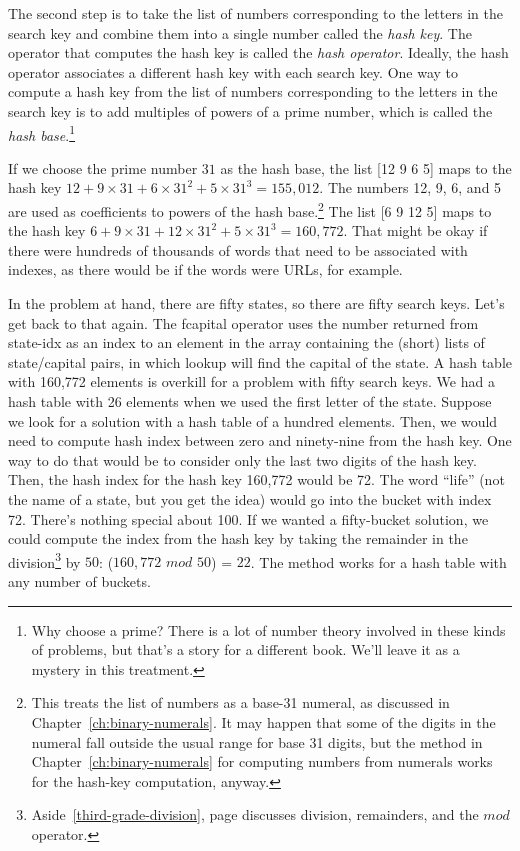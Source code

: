 The second step is to take the list of numbers corresponding
to the letters in the search key
and combine them into a single number called
the \emph{hash key}.
The operator that computes the hash key is called
the \emph{hash operator}.
Ideally, the hash operator associates a different hash key
with each search key.
One way to compute a hash key from the list of numbers
corresponding to the letters in the search key is
to add multiples of powers of a
prime number, which is called the 
\emph{hash base}.\footnote{Why choose a prime?
There is a lot of number theory involved in these kinds
of problems, but that's a story for a different book.
We'll leave it as a mystery in this treatment.}

If we choose the prime number $31$
as the hash base, the list \textsf{[12 9 6 5]} maps to the hash key
$12 + 9\times31 + 6\times31^2 + 5\times31^3 = 155,012$.
The numbers 12, 9, 6, and 5 are used as coefficients to powers of
the hash base.\footnote{This treats the 
list of numbers as a base-31 numeral, as
discussed in Chapter~\ref{ch:binary-numerals}.
It may happen that some of the digits in the numeral
fall outside the usual range for base 31 digits, 
but the method in Chapter~\ref{ch:binary-numerals}
for computing numbers from numerals works 
for the hash-key computation, anyway.}
The list \textsf{[6 9 12 5]} maps to the hash key
$6 + 9\times31 + 12\times31^2 + 5\times31^3 = 160,772$.
That might be okay if there were hundreds of thousands of words
that need to be associated with indexes, as there would be
if the words were URLs, for example.

In the problem at hand, there are fifty states,
so there are fifty search keys.
Let's get back to that again.
The \textsf{fcapital} operator uses the
number returned from \textsf{state-idx} as an index to
an element in the array containing the (short) lists of
state/capital pairs, in which
\textsf{lookup} will find the capital of the state.
A hash table with 160,772 elements is overkill for
a problem with fifty search keys.
We had a hash table with 26 elements when we used the first letter of the state.
Suppose we look for a solution with a hash table of a hundred elements.
Then, we would need to compute hash index between zero and ninety-nine
from the hash key. One way to do that would be to
consider only the last two digits of the hash key.
Then, the hash index for the hash key 160,772 would be 72.
The word ``life'' (not the name of a state, but you get the idea)
would go into the bucket
with index 72.
There's nothing special about 100.
If we wanted a fifty-bucket solution,
we could compute the index from the hash key by taking the
remainder in the division\footnote{Aside~\ref{third-grade-division},
page \pageref{third-grade-division} discusses
division, remainders, and the $mod$ operator.} 
by  $50$: ($160,772$ $mod$ $50$) = $22$.
The method works for a hash table with any number of buckets.

